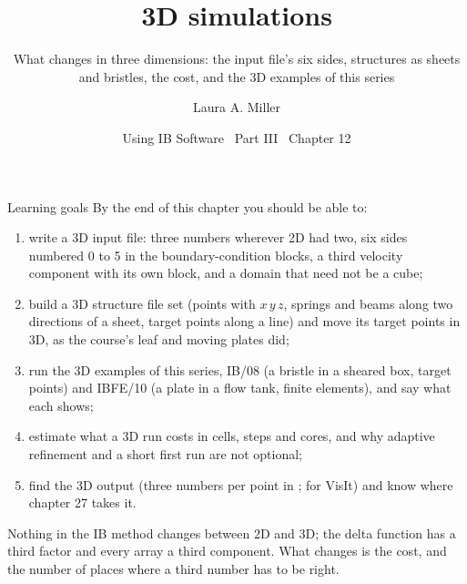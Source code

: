 \documentclass[aspectratio=169,11pt]{beamer}
\title[3D simulations]{3D simulations}
\subtitle{What changes in three dimensions: the input file's six sides, structures as sheets and bristles, the cost, and the 3D examples of this series}
\author[Miller]{Laura A. Miller}
\institute[UArizona]{Department of Mathematics, University of Arizona}
\date{Using IB Software \textbullet\ Part III \textbullet\ Chapter 12}
\begin{document}
\begin{frame}[plain]
\end{frame}

\begin{frame}{Learning goals}
\label{fr:goals}
\footnotesize By the end of this chapter you should be able to:
\begin{enumerate}
  \item write a 3D input file: three numbers wherever 2D had two, six sides numbered 0 to 5 in the boundary-condition blocks, a third velocity component with its own block, and a domain that need not be a cube;
  \item build a 3D structure file set (points with $x\,y\,z$, springs and beams along two directions of a sheet, target points along a line) and move its target points in 3D, as the course's leaf and moving plates did;
  \item run the 3D examples of this series, IB/08 (a bristle in a sheared box, target points) and IBFE/10 (a plate in a flow tank, finite elements), and say what each shows;
  \item estimate what a 3D run costs in cells, steps and cores, and why adaptive refinement and a short first run are not optional;
  \item find the 3D output (three numbers per point in ;  for VisIt) and know where chapter 27 takes it.
\end{enumerate}
\begin{punchbox}
\footnotesize Nothing in the IB method changes between 2D and 3D; the delta function has a third factor and every array a third component. What changes is the cost, and the number of places where a third number has to be right.
\end{punchbox}
\end{frame}
\end{document}
